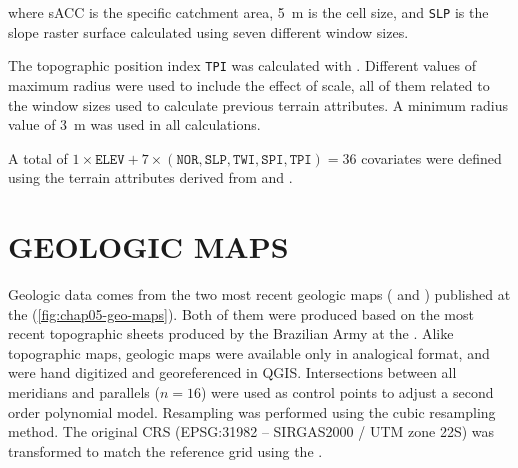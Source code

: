 \noindent where sACC is the specific catchment area, \SI{5}{\m} is the cell size, and \texttt{SLP} is the 
slope 
raster surface calculated using seven different window sizes.

The topographic position index \texttt{TPI} was calculated with . Different values of 
maximum radius were used to include the effect of scale, all of them related to the window sizes used to 
calculate previous terrain attributes. A minimum radius value of \SI{3}{\m} was used in all calculations.

A total of $1 \times \texttt{ELEV} + 7 \times (\texttt{NOR}, \texttt{SLP}, \texttt{TWI}, \texttt{SPI}, 
\texttt{TPI}) = 36$ covariates 
were defined using the terrain attributes derived from \demOld{} and \demNew{}.

\section{GEOLOGIC MAPS}
\label{sec:chap05-geo-maps}

Geologic data comes from the two most recent geologic maps (\geoOld{} and \geoNew{}) published at the 
 \cite{GasparettoEtAl1988, MacielFilho1990} (\autoref{fig:chap05-geo-maps}). Both of 
them were produced based on the most recent topographic sheets produced by the Brazilian Army at the 
 \cite{DSG1980, DSG1992, DSG1992a}. Alike topographic maps, geologic maps were 
available only in analogical format, and were hand digitized and georeferenced in QGIS. Intersections 
between all meridians and parallels ($n = 16$) were used as control points to adjust a second order polynomial 
model. Resampling was performed using the cubic resampling method. The original CRS 
(EPSG:31982 -- SIRGAS2000 / UTM zone 22S) was transformed to match the reference grid using the 
 \cite{BivandEtAl2013a}.

